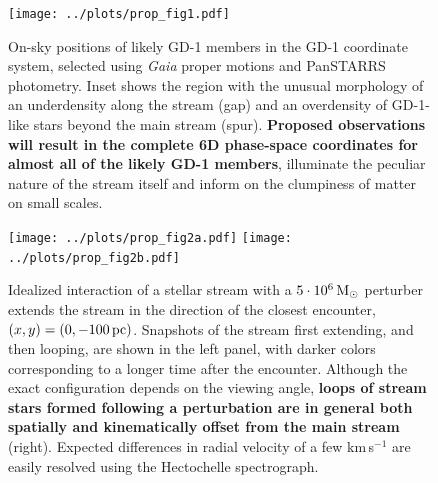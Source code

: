 \documentclass[12pt]{article}
\begin{document}
\begin{figure}
\begin{center}
\texttt{[image: ../plots/prop\_fig1.pdf]}
\caption{\small On-sky positions of likely GD-1 members in the GD-1 coordinate system, selected using \emph{Gaia} proper motions and PanSTARRS photometry.
Inset shows the region with the unusual morphology of an underdensity along the stream (gap) and an overdensity of GD-1-like stars beyond the main stream (spur).
{\bf Proposed observations will result in the complete 6D phase-space coordinates for almost all of the likely GD-1 members}, illuminate the peculiar nature of the stream itself and inform on the clumpiness of matter on small scales.
}
\label{fig:fos}
\end{center}
\end{figure}

\begin{figure}\vskip-0.41in
\begin{center}
\texttt{[image: ../plots/prop\_fig2a.pdf]}
\hspace{0.2cm}
\texttt{[image: ../plots/prop\_fig2b.pdf]}
\caption{\small Idealized interaction of a stellar stream with a $5\cdot10^6\,\rm M_\odot$ perturber extends the stream in the direction of the closest encounter, $(x,y)=(0,-100\,\rm pc)$. 
Snapshots of the stream first extending, and then looping, are shown in the left panel, with darker colors corresponding to a longer time after the encounter.
Although the exact configuration depends on the viewing angle, {\bf loops of stream stars formed following a perturbation are in general both spatially and kinematically offset from the main stream} (right). 
Expected differences in radial velocity of a few km\,s$^{-1}$ are easily resolved using the Hectochelle spectrograph.
}
\label{fig:loops}
\end{center}
\end{figure}
\end{document}

